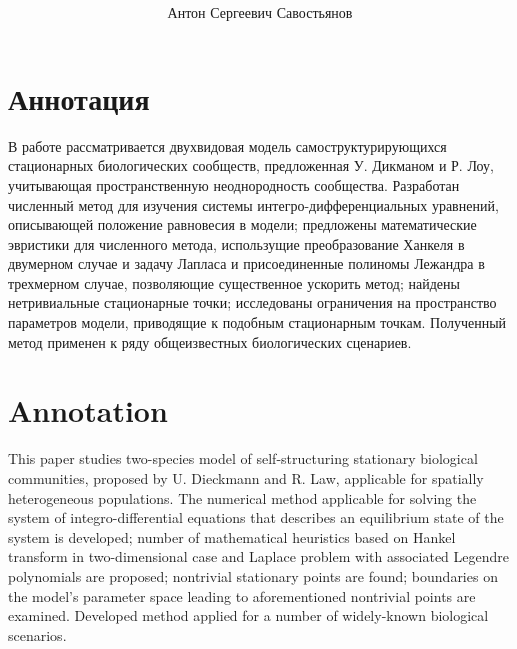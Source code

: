 \documentclass[hyperpdf, nobind, oneside, 16pt]{hepthesis}
\title{
\textcyrillic{Механизмы сосуществования стационарных биологических сообществ в пространствах разных размерностей}}
\author{Антон Сергеевич Савостьянов}
\begin{document}
\thispagestyle{empty}
\section*{Аннотация}

В работе рассматривается двухвидовая  модель самоструктурирующихся стационарных биологических сообществ, предложенная У. Дикманом и Р. Лоу, учитывающая пространственную неоднородность сообщества. Разработан численный метод для изучения системы интегро-дифференциальных уравнений, описывающей положение равновесия в модели; предложены математические эвристики для численного метода, использущие преобразование Ханкеля в двумерном случае и задачу Лапласа и присоединенные полиномы Лежандра в трехмерном случае, позволяющие существенное ускорить метод; найдены нетривиальные стационарные точки; исследованы ограничения на пространство параметров модели, приводящие к подобным стационарным точкам. Полученный метод применен к ряду общеизвестных биологических сценариев.


\newpage

\thispagestyle{empty}
\section*{Annotation}

This paper studies two-species model of self-structuring stationary biological communities, proposed by U. Dieckmann and R. Law, applicable for spatially heterogeneous populations. The numerical method applicable for solving the system of integro-differential equations that describes an equilibrium state of the system is developed; number of mathematical heuristics based on Hankel transform in two-dimensional case and Laplace problem with associated Legendre polynomials are proposed; nontrivial stationary points are found; boundaries on the model's parameter space leading to aforementioned nontrivial points are examined. Developed method applied for a number of widely-known biological scenarios.
\end{document}
